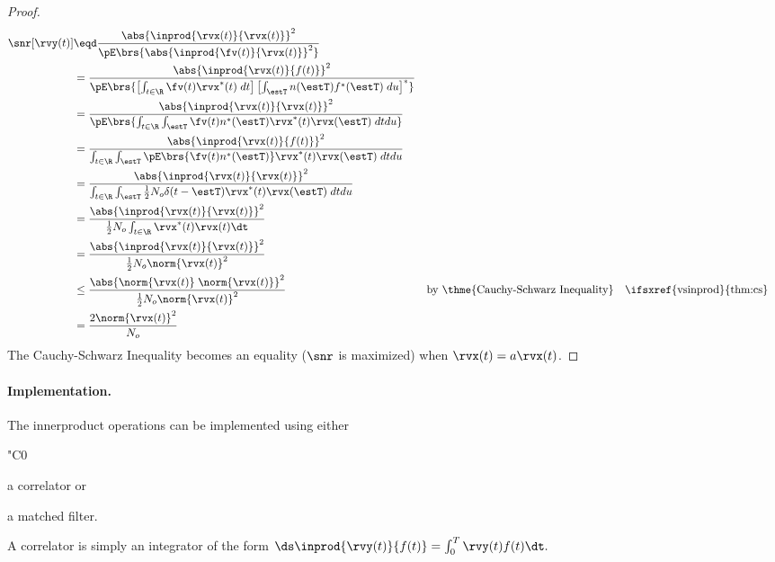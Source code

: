 \begin{proof}
\begin{align*}
   \snr[\rvy(t)]
     &\eqd \frac{\abs{\inprod{\rvx(t)}{\rvx(t)}}^2}
                {\pE\brs{\abs{\inprod{\fv(t)}{\rvx(t)}}^2}}
   \\&=    \frac{\abs{\inprod{\rvx(t)}{f(t)}}^2}
                {\pE\brs{\left[\int_{t\in\R} \fv(t)\rvx^\ast(t)\;dt\right]
                      \left[\int_{\estT} n(\estT)f^\ast(\estT)\;du\right]^\ast}
                }
   \\&=    \frac{\abs{\inprod{\rvx(t)}{\rvx(t)}}^2}
                {\pE\brs{\int_{t\in\R} \int_{\estT} \fv(t)n^\ast(\estT)\rvx^\ast(t)\rvx(\estT)\;dtdu}}
   \\&=    \frac{\abs{\inprod{\rvx(t)}{f(t)}}^2}
                {\int_{t\in\R} \int_{\estT} \pE\brs{\fv(t)n^\ast(\estT)}\rvx^\ast(t)\rvx(\estT)\;dtdu}
   \\&=    \frac{\abs{\inprod{\rvx(t)}{\rvx(t)}}^2}
                {\int_{t\in\R} \int_{\estT} \frac{1}{2}N_o\delta(t-\estT) \rvx^\ast(t)\rvx(\estT)\;dtdu}
   \\&=    \frac{\abs{\inprod{\rvx(t)}{\rvx(t)}}^2}
                {\frac{1}{2}N_o \int_{t\in\R} \rvx^\ast(t)\rvx(t)\dt}
   \\&=    \frac{\abs{\inprod{\rvx(t)}{\rvx(t)}}^2}
                {\frac{1}{2}N_o \norm{\rvx(t)}^2}
   \\&\le  \frac{\abs{\norm{\rvx(t)}\;\norm{\rvx(t)}}^2}
                {\frac{1}{2}N_o \norm{\rvx(t)}^2}
     &&    \text{by \thme{Cauchy-Schwarz Inequality}}
     &&    \text{\ifsxref{vsinprod}{thm:cs}}
   \\&=    \frac{2\norm{\rvx(t)}^2}
                {N_o }
\end{align*}
The Cauchy-Schwarz Inequality becomes an equality
($\snr$ is maximized) when $\rvx(t)=a\rvx(t)$.
\end{proof}

\paragraph{Implementation.}
The innerproduct operations can be implemented using either
  \begin{dingautolist}{"C0}
     \item a correlator or
     \item a matched filter.
  \end{dingautolist}

A correlator is simply an integrator of the form
   $\ds\inprod{\rvy(t)}{f(t)} = \int_0^T \rvy(t)f(t)\dt.$

